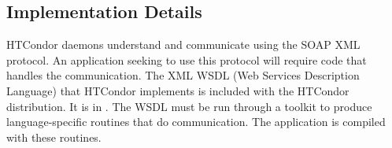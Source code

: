 
\subsection{\label{sec:WebService-Implementation} Implementation Details}

HTCondor daemons understand and communicate using the
SOAP XML protocol.
An application seeking to use this protocol
will require code that handles the communication.
The XML WSDL (Web Services Description Language)
that HTCondor implements is included with the
HTCondor distribution.
It is in .
The WSDL must be run through a toolkit to produce
language-specific routines that do communication.
The application is compiled with these routines.

